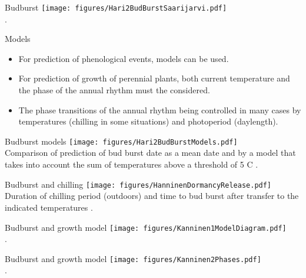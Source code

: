 \documentclass[10pt]{beamer}
\begin{document}
\begin{frame}{Budburst}
    \centering
    \texttt{[image: figures/Hari2BudBurstSaarijarvi.pdf]}\\
    {\small \autocite[from][]{Hari1991}.}
\end{frame}

\begin{frame}{Models}
    \begin{itemize}
        \item For prediction of phenological events, models can be used.
        \item For prediction of growth of perennial plants, both current
        temperature and the phase of the annual rhythm must the considered.
        \item The phase transitions of the annual rhythm being controlled
        in many cases by temperatures (chilling in some situations) and
        photoperiod (daylength).
    \end{itemize}
\end{frame}

\begin{frame}{Budburst models}
    \centering
    \texttt{[image: figures/Hari2BudBurstModels.pdf]}\\
    {\small Comparison of prediction of bud burst date as a mean date and by a model that takes into account
    the sum of temperatures above a threshold of 5 C \autocite[from][]{Hari1991}.}
\end{frame}

\begin{frame}{Budburst and chilling}
    \centering
    \texttt{[image: figures/HanninenDormancyRelease.pdf]}\\
    {\small Duration of chilling period (outdoors) and time to bud burst after transfer
    to the indicated temperatures \autocite[from][]{Hanninen1990}.}
\end{frame}

\begin{frame}{Budburst and growth model}
    \centering
    \texttt{[image: figures/Kanninen1ModelDiagram.pdf]}\\
    {\small \autocite[from][]{KanninenEtAl1982}.}
\end{frame}

\begin{frame}{Budburst and growth model}
    \centering
    \texttt{[image: figures/Kanninen2Phases.pdf]}\\
    {\small \autocite[from][]{KanninenEtAl1982}.}
\end{frame}
\end{document}
